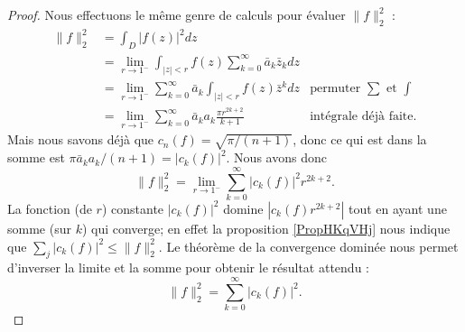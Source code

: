 \begin{proof}
    Nous effectuons le même genre de calculs pour évaluer \( \| f \|^2_2\) :
    \begin{subequations}
        \begin{align}
            \| f \|_2^2&=\int_D| f(z) |^2dz\\
            &=\lim_{r\to 1^-}\int_{| z |<r}f(z)\sum_{k=0}^{\infty}\bar a_k\bar z_kdz\\
            &=\lim_{r\to 1^-}\sum_{k=0}^{\infty}\bar a_k\int_{| z |<r}f(z)\bar z^kdz&\text{permuter } \sum\text{ et } \int\\
            &=\lim_{r\to 1^-}\sum_{k=0}^{\infty}\bar a_ka_k\frac{ \pi r^{2k+2} }{ k+1 }&\text{intégrale déjà faite}.
        \end{align}
    \end{subequations}
    Mais nous savons déjà que \( c_n(f)=\sqrt{\pi/(n+1)}\), donc ce qui est dans la somme est \( \pi\bar a_ka_k/(n+1)=| c_k(f) |^2\). Nous avons donc
    \begin{equation}
        \| f \|^2_2=\lim_{r\to 1^-}\sum_{k=0}^{\infty}| c_k(f) |^2 r^{2k+2}.
    \end{equation}
    La fonction (de \( r\)) constante \( | c_k(f) |^2\) domine \( | c_k(f)r^{2k+2} |\) tout en ayant une somme (sur \( k\)) qui converge; en effet la proposition \ref{PropHKqVHj} nous indique que \( \sum_j| c_k(f) |^2\leq \| f \|_2^2\). Le théorème de la convergence dominée nous permet d'inverser la limite et la somme pour obtenir le résultat attendu :
    \begin{equation}
        \| f \|_2^2=\sum_{k=0}^{\infty}| c_k(f) |^2.
    \end{equation}
\end{proof}
